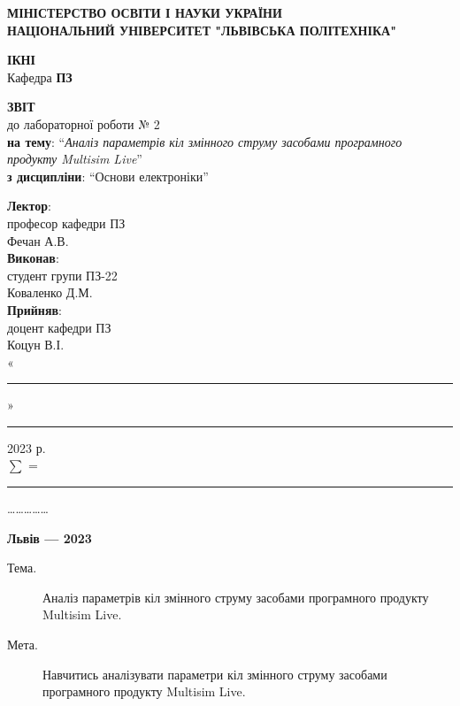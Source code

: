 \documentclass{article}
\newcommand\subject{Основи електроніки}
\newcommand\lecturer{професор кафедри ПЗ \\ Фечан А.В.}
\newcommand\teacher{доцент кафедри ПЗ \\ Коцун В.І.}
\newcommand\mygroup{ПЗ-22}
\newcommand\lab{2}
\newcommand\theme{Аналіз параметрів кіл змінного струму
	засобами програмного продукту Multisim Live}
\newcommand\purpose{Навчитись аналізувати параметри кіл змінного струму
	засобами програмного продукту Multisim Live}
\begin{document}
\begin{normalsize}
	\begin{titlepage}
		\thispagestyle{empty}
		\begin{center}
			\textbf{МІНІСТЕРСТВО ОСВІТИ І НАУКИ УКРАЇНИ\\
				НАЦІОНАЛЬНИЙ УНІВЕРСИТЕТ "ЛЬВІВСЬКА ПОЛІТЕХНІКА"}
		\end{center}
		\begin{flushright}
			\textbf{ІКНІ}\\
			Кафедра \textbf{ПЗ}
		\end{flushright}
		\vspace{200pt}
		\begin{center}
			\textbf{ЗВІТ}\\
			\vspace{10pt}
			до лабораторної роботи № \lab\\
			\textbf{на тему}: “\textit{\theme}”\\
			\textbf{з дисципліни}: “\subject”
		\end{center}
		\vspace{112pt}
		\begin{flushright}
			
			\textbf{Лектор}:\\
			\lecturer\\
			\vspace{28pt}
			\textbf{Виконав}:\\
			
			студент групи \mygroup\\
			Коваленко Д.М.\\
			\vspace{28pt}
			\textbf{Прийняв}:\\
			
			\teacher\\
			
			\vspace{28pt}
			«\rule{1cm}{0.15mm}» \rule{1.5cm}{0.15mm} 2023 р.\\
			$\sum$ = \rule{1cm}{0.15mm}……………\\
			
		\end{flushright}
		\vspace{\fill}
		\begin{center}
			\textbf{Львів — 2023}
		\end{center}
	\end{titlepage}
		
	\begin{description}
		\item[Тема.] \theme.
		\item[Мета.] \purpose.
	\end{description}


\end{normalsize}
\end{document}
